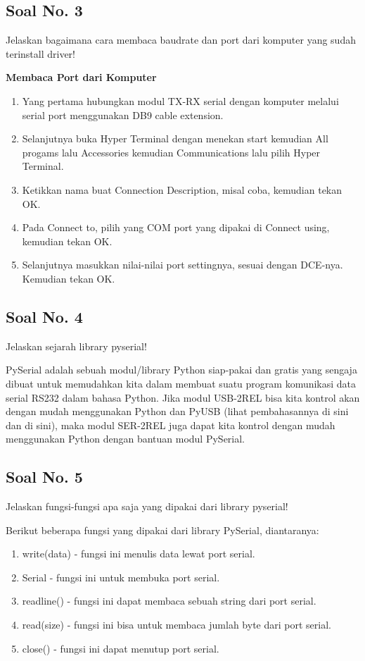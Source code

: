 \subsection{Soal No. 3}
Jelaskan bagaimana cara membaca baudrate dan port dari komputer yang sudah terinstall driver!

\hfill \break
\textbf{Membaca Port dari Komputer}

\begin{enumerate}
	\item Yang pertama hubungkan modul TX-RX serial dengan komputer melalui serial port menggunakan DB9 cable extension.
	\item Selanjutnya buka Hyper Terminal dengan menekan start kemudian All progams lalu Accessories kemudian Communications lalu pilih Hyper Terminal.
	\item Ketikkan nama buat Connection Description, misal coba, kemudian tekan OK.
	\item Pada Connect to, pilih yang COM port yang dipakai di Connect using, kemudian tekan OK.
	\item Selanjutnya masukkan nilai-nilai port settingnya, sesuai dengan DCE-nya. Kemudian tekan OK.
\end{enumerate}



\subsection{Soal No. 4}
Jelaskan sejarah library pyserial!

\hfill \break
PySerial adalah sebuah modul/library Python siap-pakai dan gratis yang sengaja dibuat untuk memudahkan kita dalam membuat suatu program komunikasi data serial RS232 dalam bahasa Python.
Jika modul USB-2REL bisa kita kontrol akan dengan mudah menggunakan Python dan PyUSB (lihat pembahasannya di sini dan di sini), maka modul SER-2REL juga dapat kita kontrol dengan mudah menggunakan Python dengan bantuan modul PySerial.

\subsection{Soal No. 5}
Jelaskan fungsi-fungsi apa saja yang dipakai dari library pyserial!

\hfill \break
Berikut beberapa fungsi yang dipakai dari library PySerial, diantaranya:
\begin{enumerate}
	\item write(data) - fungsi ini menulis data lewat port serial.
	\item Serial - fungsi ini untuk membuka port serial.
	\item readline() - fungsi ini dapat membaca sebuah string dari port serial.
	\item read(size) - fungsi ini bisa untuk membaca jumlah byte dari port serial.
	\item close() - fungsi ini dapat menutup port serial.
\end{enumerate}

